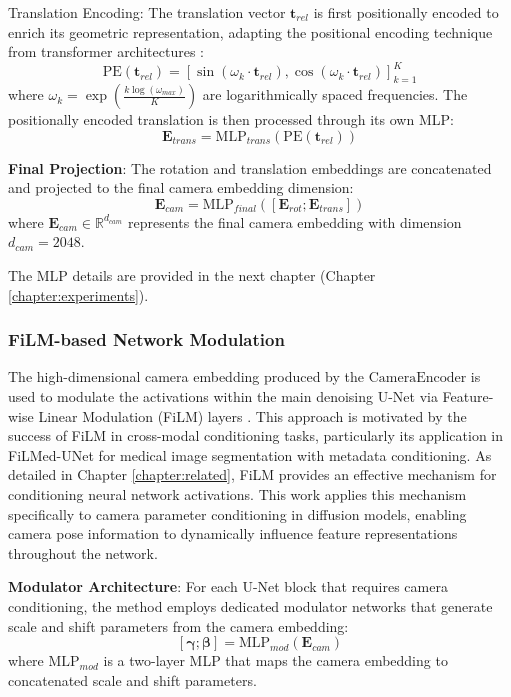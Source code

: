 Translation Encoding: The translation vector $\mathbf{t}_{rel}$ is first positionally encoded to enrich its geometric representation, adapting the positional encoding technique from transformer architectures \cite{attention_is_all_you_need}:
\[ \text{PE}(\mathbf{t}_{rel}) = [\sin(\omega_k \cdot \mathbf{t}_{rel}), \cos(\omega_k \cdot \mathbf{t}_{rel})]_{k=1}^{K} \]
where $\omega_k = \exp(\frac{k \log(\omega_{max})}{K})$ are logarithmically spaced frequencies. The positionally encoded translation is then processed through its own MLP:
\[ \mathbf{E}_{trans} = \text{MLP}_{trans}(\text{PE}(\mathbf{t}_{rel})) \]

\textbf{Final Projection}: The rotation and translation embeddings are concatenated and projected to the final camera embedding dimension:
\[ \mathbf{E}_{cam} = \text{MLP}_{final}([\mathbf{E}_{rot}; \mathbf{E}_{trans}]) \]
where $\mathbf{E}_{cam} \in \mathbb{R}^{d_{cam}}$ represents the final camera embedding with dimension $d_{cam} = 2048$.

The MLP details are provided in the next chapter (Chapter \ref{chapter:experiments}).

\subsubsection{FiLM-based Network Modulation}
The high-dimensional camera embedding produced by the $\text{CameraEncoder}$ is used to modulate the activations within the main denoising U-Net via Feature-wise Linear Modulation (FiLM) layers \cite{film}. This approach is motivated by the success of FiLM in cross-modal conditioning tasks, particularly its application in FiLMed-UNet \cite{filmedunet} for medical image segmentation with metadata conditioning. As detailed in Chapter \ref{chapter:related}, FiLM provides an effective mechanism for conditioning neural network activations. This work applies this mechanism specifically to camera parameter conditioning in diffusion models, enabling camera pose information to dynamically influence feature representations throughout the network.

\textbf{Modulator Architecture}: For each U-Net block that requires camera conditioning, the method employs dedicated modulator networks that generate scale and shift parameters from the camera embedding:
\[ [\boldsymbol{\gamma}; \boldsymbol{\beta}] = \text{MLP}_{mod}(\mathbf{E}_{cam}) \]
where $\text{MLP}_{mod}$ is a two-layer MLP that maps the camera embedding to concatenated scale and shift parameters.

